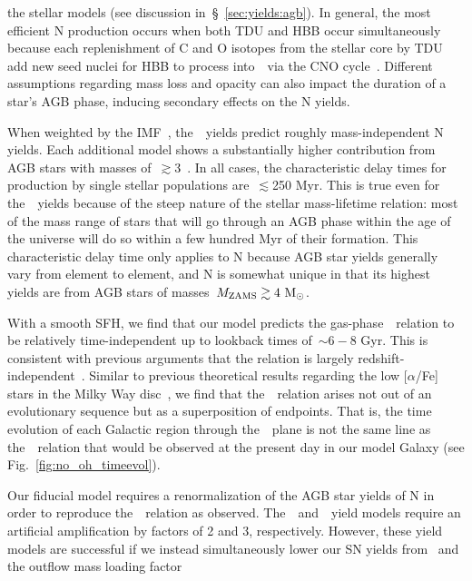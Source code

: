 \documentclass[ms.tex]{subfiles}
\begin{document}
the stellar models (see discussion in~\S~\ref{sec:yields:agb}).
In general, the most efficient N production occurs when both TDU and HBB
occur simultaneously because each replenishment of C and O isotopes from the
stellar core by TDU add new seed nuclei for HBB to process into~\Nfourteen~via
the CNO cycle~\citep{Ventura2013}.
Different assumptions regarding mass loss and opacity can also impact the
duration of a star's AGB phase, inducing secondary effects on the N yields.
\par
When weighted by the IMF~\citep{Kroupa2001}, the~\cristallo~yields predict
roughly mass-independent N yields.
Each additional model shows a substantially higher contribution from AGB stars
with masses of~$\gtrsim$3~\msun.
In all cases, the characteristic delay times for production by single stellar
populations are~$\lesssim$250 Myr.
This is true even for the~\cristallo~yields because of the steep nature of the
stellar mass-lifetime relation: most of the mass range of stars that will go
through an AGB phase within the age of the universe will do so within a few
hundred Myr of their formation.
This characteristic delay time only applies to N because AGB star yields
generally vary from element to element, and N is somewhat unique in that its
highest yields are from AGB stars of masses~$M_\text{ZAMS} \gtrsim 4~\text{M}_\odot$.
\par
With a smooth SFH, we find that our model predicts the gas-phase~\ohno~relation
to be relatively time-independent up to lookback times of~$\sim6 - 8$ Gyr.
This is consistent with previous arguments that the relation is largely
redshift-independent~\citep{Vincenzo2018, HaydenPawson2021}.
Similar to previous theoretical results regarding the low [$\alpha$/Fe] stars
in the Milky Way disc~\citep[e.g.][]{Schoenrich2009, Nidever2014, Buck2020,
Sharma2021, Johnson2021}, we find that the~\ohno~relation arises not out of an
evolutionary sequence but as a superposition of endpoints.
That is, the time evolution of each Galactic region through the~\ohno~plane
is not the same line as the~\ohno~relation that would be observed at the
present day in our model Galaxy (see Fig.~\ref{fig:no_oh_timeevol}).
\par
Our fiducial model requires a renormalization of the AGB star yields of N in
order to reproduce the~\ohno~relation as observed.
The~\cristallo~and~\ventura~yield models require an artificial amplification by
factors of 2 and 3, respectively.
However, these yield models are successful if we instead simultaneously lower
our SN yields from~\citet{Johnson2021} and the outflow mass loading factor
\end{document}
